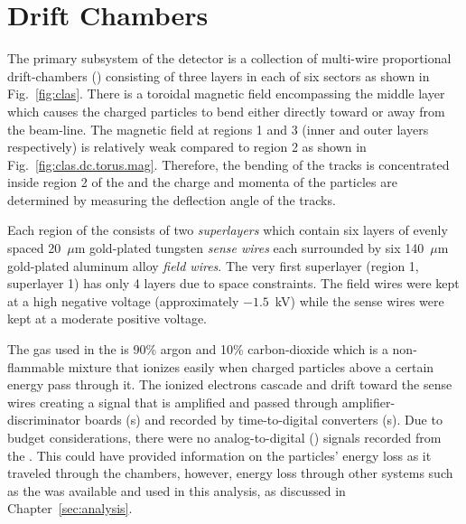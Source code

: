 \section{Drift Chambers}\label{sec:clas.dc}

The primary subsystem of the  detector is a collection of multi-wire proportional drift-chambers\cite{clas.dc} () consisting of three layers in each of six sectors as shown in Fig.~\ref{fig:clas}. There is a toroidal magnetic field encompassing the middle layer which causes the charged particles to bend either directly toward or away from the beam-line. The magnetic field at regions 1 and 3 (inner and outer layers respectively) is relatively weak compared to region 2 as shown in Fig.~\ref{fig:clas.dc.torus.mag}. Therefore, the bending of the tracks is concentrated inside region 2 of the  and the charge and momenta of the particles are determined by measuring the deflection angle of the tracks.


Each region of the  consists of two \emph{superlayers} which contain six layers of evenly spaced 20~$\mu$m gold-plated tungsten \emph{sense wires} each surrounded by six 140~$\mu$m gold-plated aluminum alloy \emph{field wires}. The very first superlayer (region 1, superlayer 1) has only 4 layers due to space constraints. The field wires were kept at a high negative voltage (approximately $-1.5$~kV) while the sense wires were kept at a moderate positive voltage.

The gas used in the  is 90\% argon and 10\% carbon-dioxide which is a non-flammable mixture that ionizes easily when charged particles above a certain energy pass through it. The ionized electrons cascade and drift toward the sense wires creating a signal that is amplified and passed through amplifier-discriminator boards (s) and recorded by time-to-digital converters (s). Due to budget considerations, there were no analog-to-digital () signals recorded from the . This could have provided information on the particles' energy loss as it traveled through the chambers, however, energy loss through other systems such as the  was available and used in this analysis, as discussed in Chapter~\ref{sec:analysis}.
